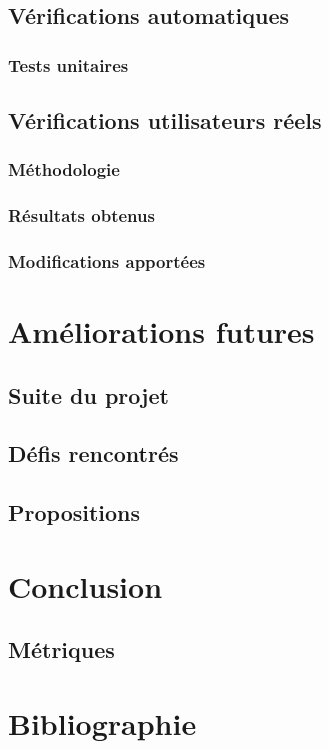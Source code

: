\documentclass{EPL-master-thesis-covers-FR}
\begin{document}

		\section{Vérifications automatiques}

			\subsection*{Tests unitaires}

			

		\section{Vérifications utilisateurs réels}


			\subsection*{Méthodologie}

				

			\subsection*{Résultats obtenus}

				

			\subsection*{Modifications apportées}

		

	\chapter{Améliorations futures}


		\section{Suite du projet}
			\label{ref:suite_projet}

		

		\section{Défis rencontrés}

			

		\section{Propositions}

			
	\chapter{Conclusion}

		

		\section{Métriques}
		

	\chapter{Bibliographie}

		
		
		

	

	\setlength{\parskip}{0em}
	\backcoverpage
\end{document}

